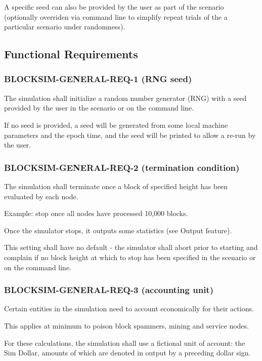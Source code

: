 \documentclass{scrreprt}
\begin{document}
A specific seed can also be provided by the user as part of the scenario
(optionally overriden via command line to simplify repeat trials of the
a particular scenario under randomness).


\subsection{Functional Requirements}


\subsubsection{BLOCKSIM-GENERAL-REQ-1 (RNG seed)}

The simulation shall initialize a random number generator (RNG) with a seed
provided by the user in the scenario or on the command line.

If no seed is provided, a seed will be generated from some local machine
parameters and the epoch time, and the seed will be printed to allow
a re-run by the user.

\subsubsection{BLOCKSIM-GENERAL-REQ-2 (termination condition)}

The simulation shall terminate once a block of specified height has been
evaluated by each node.

Example: stop once all nodes have processed 10,000 blocks.

Once the simulator stops, it outputs some statistics (see Output feature).

This setting shall have no default - the simulator shall abort prior
to starting and complain if no block height at which to stop has been
specified in the scenario or on the command line.

\subsubsection{BLOCKSIM-GENERAL-REQ-3 (accounting unit)}

Certain entities in the simulation need to account economically for
their actions.

This applies at minimum to poison block spammers, mining and service nodes.

For these calculations, the simulation shall use a fictional unit of account:
the Sim Dollar, amounts of which are denoted in output by a preceding dollar sign.
\end{document}
